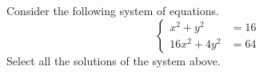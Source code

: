 \documentclass{ximera}
\author{Kenneth Berglund}
\begin{document}
\begin{exercise}
Consider the following system of equations.
$$
\begin{cases}
x^2 +y^2 & = 16 \\
16x^2 + 4y^2 & = 64
\end{cases}
$$
Select all the solutions of the system above.
\begin{selectAll}
\end{selectAll}

\end{exercise}
\end{document}
